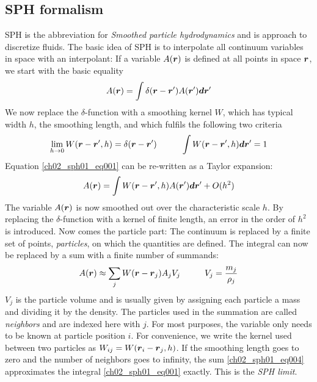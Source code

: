 \subsection{SPH formalism}
SPH is the abbreviation for \emph{Smoothed particle hydrodynamics} and is approach to discretize fluids. The basic idea of SPH is to interpolate all continuum variables in space with an interpolant: If a variable $A(\boldsymbol{r})$ is defined at all points in space $\boldsymbol{r}$, we start with the basic equality
\begin{equation}
\label{ch02_sph01_eq001}
A(\boldsymbol{r}) = \int  \delta(\boldsymbol{r} - \boldsymbol{r}') A(\boldsymbol{r}') \boldsymbol{d} \boldsymbol{r}'
\end{equation}
We now replace the $\delta$-function with a smoothing kernel $W$, which has typical width $h$, the smoothing length, and which fulfils the following two criteria
\begin{equation}
\label{ch02_sph01_eq002}
\lim_{h \to 0} W(\boldsymbol{r} - \boldsymbol{r}', h) = \delta(\boldsymbol{r} - \boldsymbol{r}') \hspace{1.0cm}
\int W(\boldsymbol{r} - \boldsymbol{r}', h) \boldsymbol{d} \boldsymbol{r}' = 1
\end{equation}
Equation \ref{ch02_sph01_eq001} can be re-written as a Taylor expansion:
\begin{equation}
\label{ch02_sph01_eq003}
A(\boldsymbol{r}) = \int  W(\boldsymbol{r} - \boldsymbol{r}', h) A(\boldsymbol{r}') \boldsymbol{d} \boldsymbol{r}' + O(h^2)
\end{equation}
The variable $A(\boldsymbol{r})$ is now smoothed out over the characteristic scale $h$. By replacing the $\delta$-function with a kernel of finite length, an error in the order of $h^2$ is introduced. Now comes the particle part: The continuum is replaced by a finite set of points, \emph{particles}, on which the quantities are defined. The integral can now be replaced by a sum with a finite number of summands:
\begin{equation}
\label{ch02_sph01_eq004}
A(\boldsymbol{r}) \approx \sum_{j} W(\boldsymbol{r} - \boldsymbol{r}_{j}) A_j V_{j} \hspace{1.0cm} V_{j} = \frac{m_j}{\rho_j}
\end{equation}
$V_{j}$ is the particle volume and is usually given by assigning each particle a mass and dividing it by the density. The particles used in the summation are called \emph{neighbors} and are indexed here with $j$. For most purposes, the variable only needs to be known at particle position $i$. For convenience, we write the kernel used between two particles as $W_{ij} = W( \boldsymbol{r}_{i} - \boldsymbol{r}_{j}, h)$. If the smoothing length goes to zero and the number of neighbors goes to infinity, the sum \ref{ch02_sph01_eq004} approximates the integral \ref{ch02_sph01_eq001} exactly. This is the \emph{SPH limit}.
